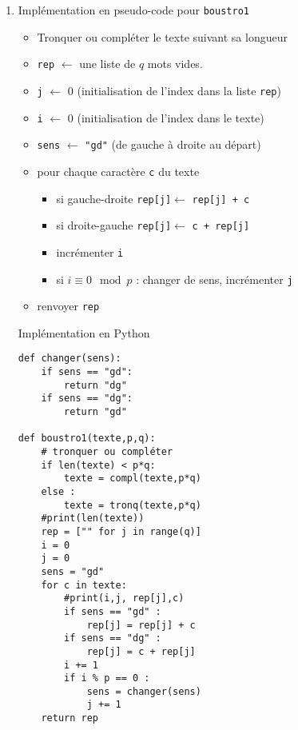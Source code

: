 \begin{enumerate}
\begin{enumerate}
\item Implémentation en pseudo-code pour \verb|boustro1|
\begin{itemize}
  \item Tronquer ou compléter le texte suivant sa longueur
  \item \verb|rep| $\longleftarrow$ une liste de $q$ mots vides.
  \item \verb|j|   $\longleftarrow$  0 (initialisation de l'index dans la liste \verb|rep|)
  \item \verb|i|   $\longleftarrow$  0 (initialisation de l'index dans le texte)
  \item \verb|sens| $\longleftarrow$ \verb|"gd"| (de gauche à droite au départ)
  \item pour chaque caractère \verb|c| du texte
  \begin{itemize}
   \item si gauche-droite \verb|rep[j]|$\longleftarrow$ \verb|rep[j] + c|
   \item si droite-gauche \verb|rep[j]|$\longleftarrow$ \verb|c + rep[j]|
   \item incrémenter \verb|i|
   \item si $ i \equiv 0 \mod p$ : changer de sens, incrémenter \verb|j|
  \end{itemize}
  \item renvoyer \verb|rep|
\end{itemize}
Implémentation en Python
\begin{verbatim}
def changer(sens):
    if sens == "gd":
        return "dg"
    if sens == "dg":
        return "gd"

def boustro1(texte,p,q):
    # tronquer ou compléter
    if len(texte) < p*q:
        texte = compl(texte,p*q)
    else :
        texte = tronq(texte,p*q)
    #print(len(texte))
    rep = ["" for j in range(q)]
    i = 0
    j = 0
    sens = "gd"
    for c in texte:
        #print(i,j, rep[j],c)
        if sens == "gd" :
            rep[j] = rep[j] + c
        if sens == "dg" :
            rep[j] = c + rep[j]
        i += 1
        if i % p == 0 :
            sens = changer(sens)
            j += 1
    return rep
\end{verbatim}


\end{enumerate}
\end{enumerate}
